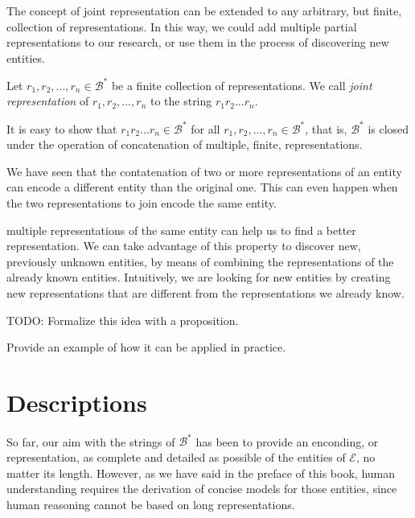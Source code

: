 The concept of joint representation can be extended to any arbitrary, but finite, collection of representations. In this way, we could add multiple partial representations to our research, or use them in the process of discovering new entities.

\begin{definition}
Let $r_1, r_2, \ldots, r_n \in \mathcal{B}^\ast$ be a finite collection of representations. We call \emph{joint representation} of $r_1, r_2, \ldots, r_n$ to the string $r_1 r_2 \ldots r_n$.
\end{definition}

It is easy to show that $r_1 r_2 \ldots r_n \in \mathcal{B}^\ast$ for all $r_1, r_2, \ldots, r_n \in \mathcal{B}^\ast$, that is, $\mathcal{B}^\ast$ is closed under the operation of concatenation of multiple, finite, representations.

{\color{red}

We have seen that the contatenation of two or more representations of an entity can encode a different entity than the original one. This can even happen when the two representations to join encode the same entity.

multiple representations of the same entity can help us to find a better representation. We can take advantage of this property to discover new, previously unknown entities, by means of combining the representations of the already known entities. Intuitively, we are looking for new entities by creating new representations that are different from the representations we already know.

TODO: Formalize this idea with a proposition.

Provide an example of how it can be applied in practice.

}

%
%

\section{Descriptions}
\label{sec:descriptions_models}

So far, our aim with the strings of $\mathcal{B}^\ast$ has been to provide an enconding, or representation, as complete and detailed as possible of the entities of $\mathcal{E}$, no matter its length. However, as we have said in the preface of this book, human understanding requires the derivation of concise models for those entities, since human reasoning cannot be based on long representations.

